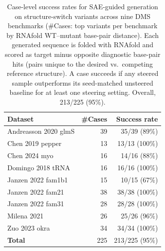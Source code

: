 \documentclass[11pt]{article}
\begin{document}
\begin{table}[ht]
\centering
\caption{Case-level success rates for SAE-guided generation on structure-switch variants across nine DMS benchmarks (\#Cases: top variants per benchmark by RNAfold WT--mutant base-pair distance). Each generated sequence is folded with RNAfold and scored as target minus opposite diagnostic base-pair hits (pairs unique to the desired vs.\ competing reference structure). A case succeeds if any steered sample outperforms its seed-matched unsteered baseline for at least one steering setting. Overall, 213/225 (95\%).}
\label{tab:generation-success}
\begin{tabular}{lrr}
\toprule
Dataset & \#Cases & Success rate \\
\midrule
Andreasson 2020 glmS & 39 & 35/39 (89\%) \\
Chen 2019 pepper & 13 & 13/13 (100\%) \\
Chen 2024 myo & 16 & 14/16 (88\%) \\
Domingo 2018 tRNA & 16 & 16/16 (100\%) \\
Janzen 2022 fam1b1 & 15 & 10/15 (67\%) \\
Janzen 2022 fam21 & 38 & 38/38 (100\%) \\
Janzen 2022 fam31 & 28 & 28/28 (100\%) \\
Milena 2021 & 26 & 25/26 (96\%) \\
Zuo 2023 okra & 34 & 34/34 (100\%) \\
\midrule
\textbf{Total} & 225 & 213/225 (95\%) \\
\bottomrule
\end{tabular}
\end{table}
\end{document}

